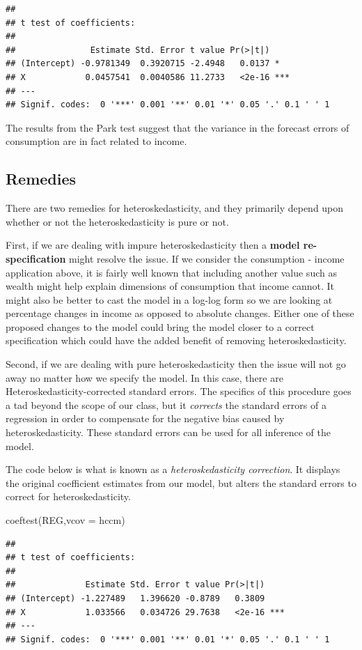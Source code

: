 \documentclass[
]{book}
\newenvironment{Shaded}{\begin{snugshade}}{\end{snugshade}}
\newcommand{\AttributeTok}[1]{\textcolor[rgb]{0.77,0.63,0.00}{#1}}
\newcommand{\FunctionTok}[1]{\textcolor[rgb]{0.00,0.00,0.00}{#1}}
\newcommand{\NormalTok}[1]{#1}
\begin{document}
\begin{verbatim}
## 
## t test of coefficients:
## 
##               Estimate Std. Error t value Pr(>|t|)    
## (Intercept) -0.9781349  0.3920715 -2.4948   0.0137 *  
## X            0.0457541  0.0040586 11.2733   <2e-16 ***
## ---
## Signif. codes:  0 '***' 0.001 '**' 0.01 '*' 0.05 '.' 0.1 ' ' 1
\end{verbatim}

The results from the Park test suggest that the variance in the forecast errors of consumption are in fact related to income.

\hypertarget{remedies}{%
\subsection{Remedies}\label{remedies}}

There are two remedies for heteroskedasticity, and they primarily depend upon whether or not the heteroskedasticity is pure or not.

First, if we are dealing with impure heteroskedasticity then a \textbf{model re-specification} might resolve the issue. If we consider the consumption - income application above, it is fairly well known that including another value such as wealth might help explain dimensions of consumption that income cannot. It might also be better to cast the model in a log-log form so we are looking at percentage changes in income as opposed to absolute changes. Either one of these proposed changes to the model could bring the model closer to a correct specification which could have the added benefit of removing heteroskedasticity.

Second, if we are dealing with pure heteroskedasticity then the issue will not go away no matter how we specify the model. In this case, there are Heteroskedasticity-corrected standard errors. The specifics of this procedure goes a tad beyond the scope of our class, but it \emph{corrects} the standard errors of a regression in order to compensate for the negative bias caused by heteroskedasticity. These standard errors can be used for all inference of the model.

The code below is what is known as a \emph{heteroskedasticity correction}. It displays the original coefficient estimates from our model, but alters the standard errors to correct for heteroskedasticity.

\begin{Shaded}
\begin{Highlighting}[]
\FunctionTok{coeftest}\NormalTok{(REG,}\AttributeTok{vcov =}\NormalTok{ hccm)}
\end{Highlighting}
\end{Shaded}

\begin{verbatim}
## 
## t test of coefficients:
## 
##              Estimate Std. Error t value Pr(>|t|)    
## (Intercept) -1.227489   1.396620 -0.8789   0.3809    
## X            1.033566   0.034726 29.7638   <2e-16 ***
## ---
## Signif. codes:  0 '***' 0.001 '**' 0.01 '*' 0.05 '.' 0.1 ' ' 1
\end{verbatim}
\end{document}
